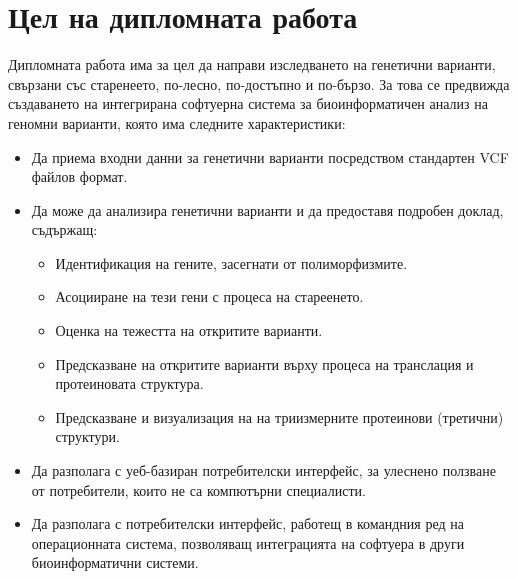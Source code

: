 \documentclass[pdftex,cyrillic,14pt,a4page,twoside,openright]{extreport}
\begin{document}
\section{Цел на дипломната работа}
Дипломната работа има за цел да направи изследването на генетични варианти, свързани със старенеето, по-лесно, по-достъпно и по-бързо. За това се предвижда създаването на интегрирана софтуерна система за биоинформатичен анализ на геномни варианти, която има следните характеристики:
\begin{itemize}
  \item Да приема входни данни за генетични варианти посредством стандартен VCF файлов формат.
  \item Да може да анализира генетични варианти и да предоставя подробен доклад, съдържащ:
  	\begin{itemize}
  		\item Идентификация на гените, засегнати от полиморфизмите.
  		\item Асоцииране на тези гени с процеса на стареенето.
  		\item Оценка на тежестта на откритите варианти.
  		\item Предсказване на откритите варианти върху процеса на транслация и протеиновата структура.
  		\item Предсказване и визуализация на на триизмерните протеинови (третични) структури.
 	\end{itemize}
  \item Да разполага с уеб-базиран потребителски интерфейс, за улеснено ползване от
потребители, които не са компютърни специалисти.
  \item Да разполага с потребителски интерфейс, работещ в командния ред на операционната система, позволяващ
интеграцията на софтуера в други биоинформатични системи.
\end{itemize}
\end{document}
